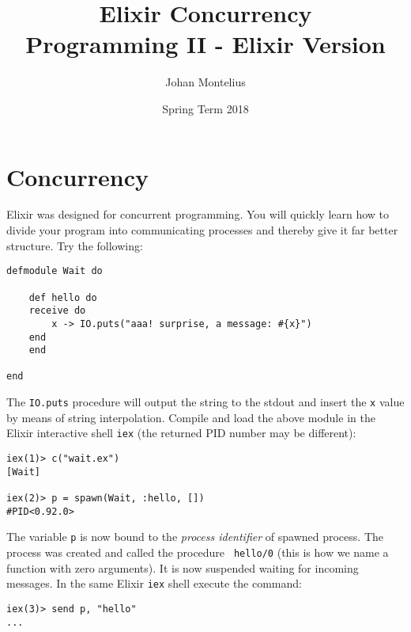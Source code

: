 \documentclass[a4paper,11pt]{article}
\begin{document}

\title{
    \textbf{Elixir Concurrency}\\
    \large{Programming II - Elixir Version}
}
\author{Johan Montelius}
\date{Spring Term 2018}
\maketitle
{}



\section*{Concurrency}

Elixir was designed for concurrent programming. You will quickly learn
how to divide your program into communicating processes and thereby
give it far better structure. Try the following:

\begin{verbatim}
defmodule Wait do

    def hello do
    receive do
        x -> IO.puts("aaa! surprise, a message: #{x}")
    end
    end

end
\end{verbatim}

The {\tt IO.puts} procedure will output the string to the stdout and
insert the {\tt x} value by means of string interpolation. Compile
and load the above module in the Elixir interactive shell {\tt iex} (the returned PID number may be different):

\begin{verbatim}
iex(1)> c("wait.ex")
[Wait]

iex(2)> p = spawn(Wait, :hello, [])
#PID<0.92.0>
\end{verbatim}

The variable {\tt p} is now bound to the {\em process identifier} of
spawned process. The process was created and called the procedure {\tt
    hello/0} (this is how we name a function with zero arguments). It is
now suspended waiting for incoming messages. In the same Elixir {\tt iex} shell
execute the command:

\begin{verbatim}
iex(3)> send p, "hello"
...
\end{verbatim}
\end{document}
